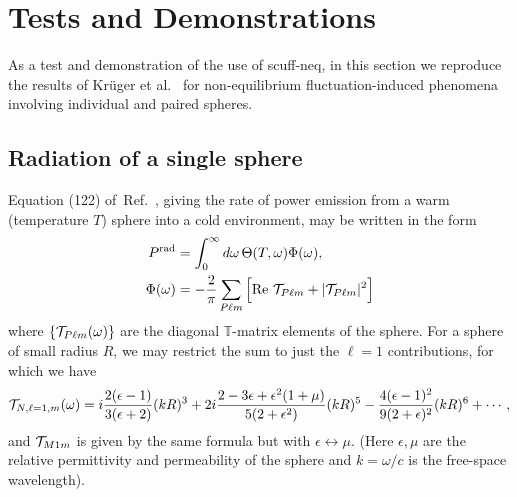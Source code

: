 \documentclass[letterpaper]{article}
\newcommand{\citeasnoun}[1]{Ref.~\citenum{#1}}
\begin{document}
\newpage
\section{Tests and Demonstrations}

As a test and demonstration of the use of {\sc scuff-neq},
in this section we reproduce the results of
Kr\"uger et al.~\cite{Kruger2012} for non-equilibrium
fluctuation-induced phenomena involving individual and paired spheres.

\subsection{Radiation of a single sphere}

Equation (122) of~\citeasnoun{Kruger2012},
giving the rate of power emission from a warm
(temperature $T$) sphere into a cold environment, 
may be written in the form
\begin{align*}
 P^{\hbox{\scriptsize{rad}}} 
  &= 
 \int_0^\infty d\omega \, \Theta(T,\omega) \Phi(\omega),
\\
 \Phi(\omega) 
 &= 
  -\frac{2}{\pi}\sum_{P \ell m}
 \Big[ \text{Re }\mathcal{T}_{P \ell m} + |\mathcal{T}_{P \ell m}|^2\Big]
\end{align*}
where $\{\mathcal{T}_{P \ell m}(\omega)\}$ are the 
diagonal $\mathbb T$-matrix elements of the sphere.
For a sphere of small radius $R$,
we may restrict the sum to just the 
$\ell=1$ contributions, for which 
we have~\cite{Kruger2012}
$$ \mathcal{T}_{N, \ell=1, m}(\omega)
   =   i\frac{2(\epsilon-1)}{3(\epsilon+2)}(kR)^3
     +2i\frac{2-3\epsilon+\epsilon^2(1+\mu)}
             {5(2+\epsilon^2)}(kR)^5
     -\frac{4(\epsilon-1)^2}{9(2+\epsilon)^2}(kR)^6
   + \cdots,
$$
and $\mathcal{T}_{M1m}$ is given by the same formula but 
with $\epsilon \leftrightarrow \mu$.
(Here $\epsilon, \mu$ are the relative
permittivity and permeability of the sphere and 
$k=\omega/c$ is the free-space wavelength).

\end{document}
